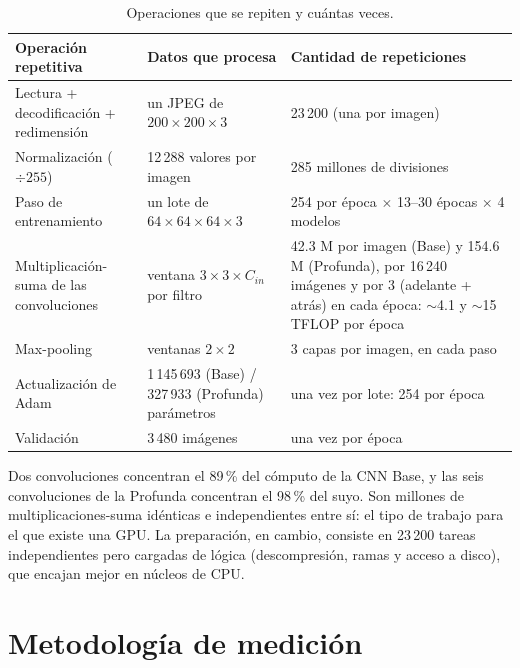 \documentclass[11pt,letterpaper]{article}
\begin{document}
\begin{table}[H]\centering\small
\caption{Operaciones que se repiten y cuántas veces.}
\label{tab:repetitivas}
\begin{tabular}{p{4.3cm}p{4.3cm}p{6.6cm}}
\toprule
Operación repetitiva & Datos que procesa & Cantidad de repeticiones \\
\midrule
Lectura + decodificación + redimensión & un JPEG de $200\times200\times3$ & 23\,200 (una por imagen) \\
Normalización ($\div255$) & 12\,288 valores por imagen & 285 millones de divisiones \\
Paso de entrenamiento & un lote de $64\times64\times64\times3$ & 254 por época $\times$ 13--30 épocas $\times$ 4 modelos \\
Multiplicación-suma de las convoluciones & ventana $3\times3\times C_{in}$ por filtro & 42.3 M por imagen (Base) y 154.6 M (Profunda), por 16\,240 imágenes y por 3 (adelante + atrás) en cada época: $\sim$4.1 y $\sim$15 TFLOP por época \\
Max-pooling & ventanas $2\times2$ & 3 capas por imagen, en cada paso \\
Actualización de Adam & 1\,145\,693 (Base) / 327\,933 (Profunda) parámetros & una vez por lote: 254 por época \\
Validación & 3\,480 imágenes & una vez por época \\
\bottomrule
\end{tabular}
\end{table}

Dos convoluciones concentran el 89\,\% del cómputo de la CNN Base, y las seis convoluciones de la Profunda concentran el 98\,\% del suyo. Son millones de multiplicaciones-suma idénticas e independientes entre sí: el tipo de trabajo para el que existe una GPU. La preparación, en cambio, consiste en 23\,200 tareas independientes pero cargadas de lógica (descompresión, ramas y acceso a disco), que encajan mejor en núcleos de CPU.

\section{Metodología de medición}
\end{document}
